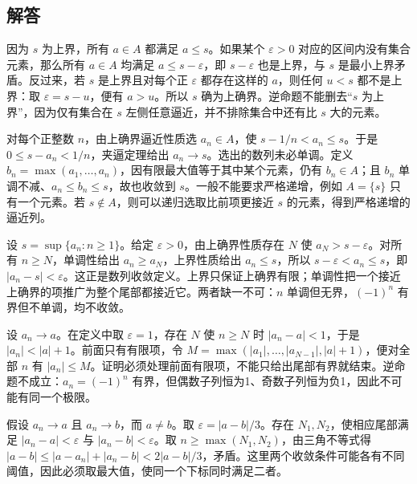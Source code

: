 \documentclass[12pt,fontset=fandol]{ctexart}
\begin{document}
\subsection{解答}
\begin{solve}\label{ans:c2q1}
因为 $s$ 为上界，所有 $a\in A$ 都满足 $a\le s$。如果某个 $\varepsilon>0$ 对应的区间内没有集合元素，那么所有 $a\in A$ 均满足 $a\le s-\varepsilon$，即 $s-\varepsilon$ 也是上界，与 $s$ 是最小上界矛盾。反过来，若 $s$ 是上界且对每个正 $\varepsilon$ 都存在这样的 $a$，则任何 $u<s$ 都不是上界：取 $\varepsilon=s-u$，便有 $a>u$。所以 $s$ 确为上确界。逆命题不能删去“$s$ 为上界”，因为仅有集合在 $s$ 左侧任意逼近，并不排除集合中还有比 $s$ 大的元素。
\end{solve}

\begin{solve}\label{ans:c2q2}
对每个正整数 $n$，由上确界逼近性质选 $a_n\in A$，使 $s-1/n<a_n\le s$。于是 $0\le s-a_n<1/n$，夹逼定理给出 $a_n\to s$。选出的数列未必单调。定义 $b_n=\max(a_1,\ldots,a_n)$，因有限最大值等于其中某个元素，仍有 $b_n\in A$；且 $b_n$ 单调不减、$a_n\le b_n\le s$，故也收敛到 $s$。一般不能要求严格递增，例如 $A=\{s\}$ 只有一个元素。若 $s\notin A$，则可以递归选取比前项更接近 $s$ 的元素，得到严格递增的逼近列。
\end{solve}

\begin{solve}\label{ans:c2q3}
设 $s=\sup\{a_n:n\ge1\}$。给定 $\varepsilon>0$，由上确界性质存在 $N$ 使 $a_N>s-\varepsilon$。对所有 $n\ge N$，单调性给出 $a_n\ge a_N$，上界性质给出 $a_n\le s$，所以 $s-\varepsilon<a_n\le s$，即 $|a_n-s|<\varepsilon$。这正是数列收敛定义。上界只保证上确界有限；单调性把一个接近上确界的项推广为整个尾部都接近它。两者缺一不可：$n$ 单调但无界，$(-1)^n$ 有界但不单调，均不收敛。
\end{solve}

\begin{solve}\label{ans:c2q4}
设 $a_n\to a$。在定义中取 $\varepsilon=1$，存在 $N$ 使 $n\ge N$ 时 $|a_n-a|<1$，于是 $|a_n|<|a|+1$。前面只有有限项，令 $M=\max(|a_1|,\ldots,|a_{N-1}|,|a|+1)$，便对全部 $n$ 有 $|a_n|\le M$。证明必须处理前面有限项，不能只给出尾部有界就结束。逆命题不成立：$a_n=(-1)^n$ 有界，但偶数子列恒为1、奇数子列恒为负1，因此不可能有同一个极限。
\end{solve}

\begin{solve}\label{ans:c2q5}
假设 $a_n\to a$ 且 $a_n\to b$，而 $a\ne b$。取 $\varepsilon=|a-b|/3$。存在 $N_1,N_2$，使相应尾部满足 $|a_n-a|<\varepsilon$ 与 $|a_n-b|<\varepsilon$。取 $n\ge\max(N_1,N_2)$，由三角不等式得 $|a-b|\le|a-a_n|+|a_n-b|<2|a-b|/3$，矛盾。这里两个收敛条件可能各有不同阈值，因此必须取最大值，使同一个下标同时满足二者。
\end{solve}
\end{document}
